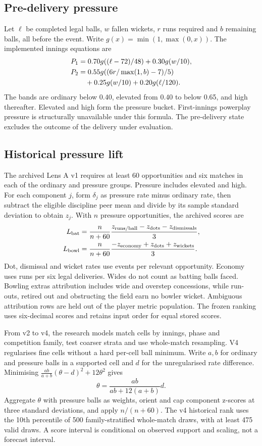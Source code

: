 \documentclass[12pt,a4paper]{article}
\begin{document}
\subsection{Pre-delivery pressure}
Let $\ell$ be completed legal balls, $w$ fallen wickets, $r$ runs required and $b$ remaining balls, all before the event. Write $g(x)=\min(1,\max(0,x))$. The implemented innings equations are
\begin{align}
P_1&=0.70g((\ell-72)/48)+0.30g(w/10),\\
P_2&=0.55g((6r/\max(1,b)-7)/5)\notag\\
   &\quad+0.25g(w/10)+0.20g(\ell/120).
\end{align}
The bands are ordinary below 0.40, elevated from 0.40 to below 0.65, and high thereafter. Elevated and high form the pressure bucket. First-innings powerplay pressure is structurally unavailable under this formula. The pre-delivery state excludes the outcome of the delivery under evaluation.

\subsection{Historical pressure lift}
The archived Lens A v1 requires at least 60 opportunities and six matches in each of the ordinary and pressure groups. Pressure includes elevated and high. For each component $j$, form $\delta_j$ as pressure rate minus ordinary rate, then subtract the eligible discipline peer mean and divide by its sample standard deviation to obtain $z_j$. With $n$ pressure opportunities, the archived scores are
\begin{align}
L_{\rm bat}&=\frac{n}{n+60}\frac{z_{\rm runs/ball}-z_{\rm dots}-z_{\rm dismissals}}{3},\\
L_{\rm bowl}&=\frac{n}{n+60}\frac{-z_{\rm economy}+z_{\rm dots}+z_{\rm wickets}}{3}.
\end{align}
Dot, dismissal and wicket rates use events per relevant opportunity. Economy uses runs per six legal deliveries. Wides do not count as batting balls faced. Bowling extras attribution includes wide and overstep concessions, while run-outs, retired out and obstructing the field earn no bowler wicket. Ambiguous attribution rows are held out of the player metric population. The frozen ranking uses six-decimal scores and retains input order for equal stored scores.

From v2 to v4, the research models match cells by innings, phase and competition family, test coarser strata and use whole-match resampling. V4 regularises fine cells without a hard per-cell ball minimum. Write $a,b$ for ordinary and pressure balls in a supported cell and $d$ for the unregularised rate difference. Minimising $\tfrac{ab}{a+b}(\theta-d)^2+12\theta^2$ gives
\begin{equation}
\theta = \frac{ab}{ab+12(a+b)}d.
\label{eq:ridge}
\end{equation}
Aggregate $\theta$ with pressure balls as weights, orient and cap component z-scores at three standard deviations, and apply $n/(n+60)$. The v4 historical rank uses the 10th percentile of 500 family-stratified whole-match draws, with at least 475 valid draws. A score interval is conditional on observed support and scaling, not a forecast interval.
\end{document}
